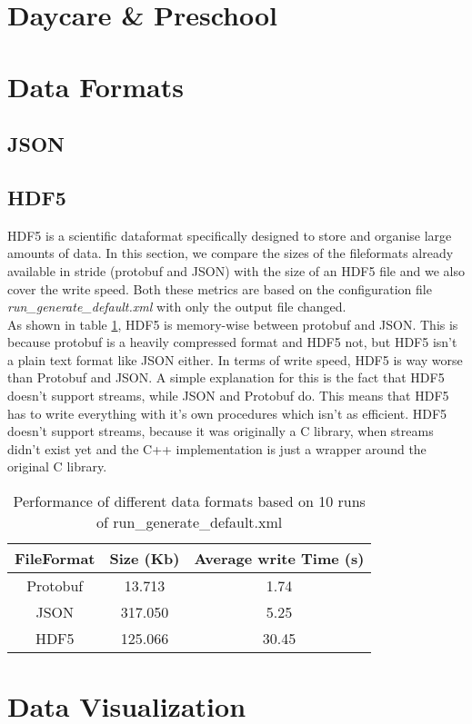 \documentclass[runningheads]{llncs}
\begin{document}
	\section{Daycare \& Preschool}
	\section{Data Formats}
	\subsection{JSON}
	\subsection{HDF5}
	HDF5 is a scientific dataformat specifically designed to store and organise large amounts of data. In this section, we compare the sizes of the fileformats already available in stride (protobuf and JSON) with the size of an HDF5 file and we also cover the write speed. Both these metrics are based on the configuration file \textit{run\_generate\_default.xml} with only the output file changed.
	\\
	As shown in table \ref{table:1}, HDF5 is memory-wise between protobuf and JSON. This is because protobuf is a heavily compressed format and HDF5 not, but HDF5 isn't a plain text format like JSON either. In terms of write speed, HDF5 is way worse than Protobuf and JSON. A simple explanation for this is the fact that HDF5 doesn't support streams, while JSON and Protobuf do. This means that HDF5 has to write everything with it's own procedures which isn't as efficient. HDF5 doesn't support streams, because it was originally a C library, when streams didn't exist yet and the C++ implementation is just a wrapper around the original C library.
	\begin{table}
		\centering
		\begin{tabular}{|c|c|c|}
			\hline
			\textbf{FileFormat} & \textbf{Size (Kb)}  & \textbf{Average write Time (s)}\\ \hline
			Protobuf & 13.713 & 1.74\\ \hline
			JSON & 317.050 & 5.25\\ \hline
			HDF5 & 125.066 & 30.45 \\ \hline
		\end{tabular}
		\caption{Performance of different data formats based on 10 runs of run\_generate\_default.xml}
		\label{table:1}
	\end{table}
	\section{Data Visualization}
\end{document}
